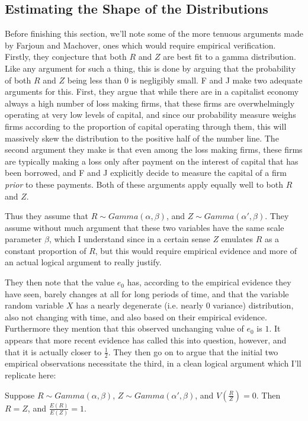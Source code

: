 \subsection{Estimating the Shape of the Distributions}
Before finishing this section, we'll note some of the more tenuous arguments made by Farjoun and Machover, ones which would require empirical verification. Firstly, they conjecture that both $R$ and $Z$ are best fit to a gamma distribution. Like any argument for such a thing, this is done by arguing that the probability of both $R$ and $Z$ being less than $0$ is negligibly small. F and J make two adequate arguments for this. First, they argue that while there are in a capitalist economy always a high number of loss making firms, that these firms are overwhelmingly operating at very low levels of capital, and since our probability measure weighs firms according to the proportion of capital operating through them, this will massively skew the distribution to the positive half of the number line. The second argument they make is that even among the loss making firms, these firms are typically making a loss only after payment on the interest of capital that has been borrowed, and F and J explicitly decide to measure the capital of a firm \textit{prior} to these payments. Both of these arguments apply equally well to both $R$ and $Z$. \par 
Thus they assume that $R \sim Gamma(\alpha,\beta)$, and $Z \sim Gamma(\alpha',\beta)$. They assume without much argument that these two variables have the same scale parameter $\beta$, which I understand since in a certain sense $Z$ emulates $R$ as a constant proportion of $R$, but this would require empirical evidence and more of an actual logical argument to really justify. \par 
They then note that the value $e_0$ has, according to the empirical evidence they have seen, barely changes at all for long periods of time, and that the variable random variable $X$ has a nearly degenerate (i.e. nearly $0$ variance) distribution, also not changing with time, and also based on their empirical evidence. Furthermore they mention that this observed unchanging value of $e_0$ is $1$. It appears that more recent evidence has called this into question, however, and that it is actually closer to $\frac{1}{2}$. They then go on to argue that the initial two empirical observations necessitate the third, in a clean logical argument which I'll replicate here:
\begin{fact}
	Suppose $R \sim Gamma(\alpha,\beta)$, $Z \sim Gamma(\alpha',\beta)$, and $V\left( \frac{R}{Z} \right) = 0$. Then $R = Z$, and $\frac{E(R)}{E(Z)} = 1$.  
\end{fact} 
